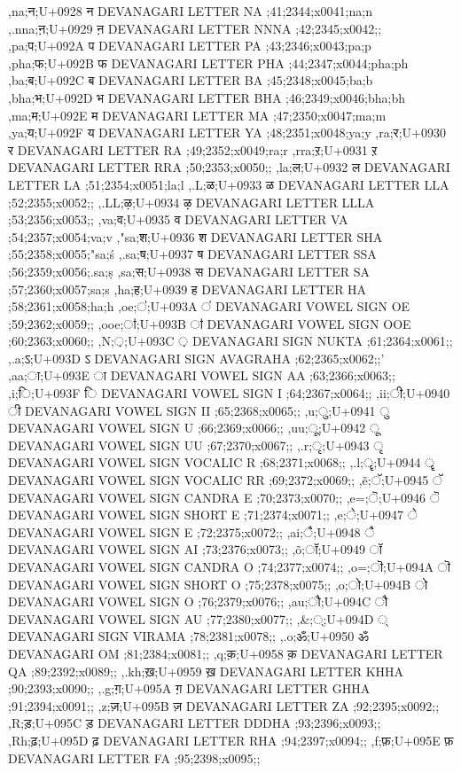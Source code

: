\documentclass{article}
\begin{document}
{,na;न;U+0928 न DEVANAGARI LETTER NA ;41;2344;x0041;na;n
,.nna;ऩ;U+0929 ऩ DEVANAGARI LETTER NNNA ;42;2345;x0042;;
,pa;प;U+092A प DEVANAGARI LETTER PA ;43;2346;x0043;pa;p
,pha;फ;U+092B फ DEVANAGARI LETTER PHA ;44;2347;x0044;pha;ph
,ba;ब;U+092C ब DEVANAGARI LETTER BA ;45;2348;x0045;ba;b
,bha;भ;U+092D भ DEVANAGARI LETTER BHA ;46;2349;x0046;bha;bh
,ma;म;U+092E म DEVANAGARI LETTER MA ;47;2350;x0047;ma;m
,ya;य;U+092F य DEVANAGARI LETTER YA ;48;2351;x0048;ya;y
,ra;र;U+0930 र DEVANAGARI LETTER RA ;49;2352;x0049;ra;r
,rra;ऱ;U+0931 ऱ DEVANAGARI LETTER RRA ;50;2353;x0050;;
,la;ल;U+0932 ल DEVANAGARI LETTER LA ;51;2354;x0051;la;l
,.L;ळ;U+0933 ळ DEVANAGARI LETTER LLA ;52;2355;x0052;;
,.LL;ऴ;U+0934 ऴ DEVANAGARI LETTER LLLA ;53;2356;x0053;;
,va;व;U+0935 व DEVANAGARI LETTER VA ;54;2357;x0054;va;v
,"sa;श;U+0936 श DEVANAGARI LETTER SHA ;55;2358;x0055;"sa;ś
,.sa;ष;U+0937 ष DEVANAGARI LETTER SSA ;56;2359;x0056;.sa;ṣ
,sa;स;U+0938 स DEVANAGARI LETTER SA ;57;2360;x0057;sa;s
,ha;ह;U+0939 ह DEVANAGARI LETTER HA ;58;2361;x0058;ha;h
,oe;ऺ;U+093A ऺ DEVANAGARI VOWEL SIGN OE ;59;2362;x0059;;
,ooe;ऻ;U+093B ऻ DEVANAGARI VOWEL SIGN OOE ;60;2363;x0060;;
,N;़;U+093C ़ DEVANAGARI SIGN NUKTA ;61;2364;x0061;;
,.a;ऽ;U+093D ऽ DEVANAGARI SIGN AVAGRAHA ;62;2365;x0062;;' 
,aa;ा;U+093E ा DEVANAGARI VOWEL SIGN AA ;63;2366;x0063;;
,i;ि;U+093F ि DEVANAGARI VOWEL SIGN I ;64;2367;x0064;;
,ii;ी;U+0940 ी DEVANAGARI VOWEL SIGN II ;65;2368;x0065;;
,u;ु;U+0941 ु DEVANAGARI VOWEL SIGN U ;66;2369;x0066;;
,uu;ू;U+0942 ू DEVANAGARI VOWEL SIGN UU ;67;2370;x0067;;
,.r;ृ;U+0943 ृ DEVANAGARI VOWEL SIGN VOCALIC R ;68;2371;x0068;;
,.l;ॄ;U+0944 ॄ DEVANAGARI VOWEL SIGN VOCALIC RR ;69;2372;x0069;;
,\~e;ॅ;U+0945 ॅ DEVANAGARI VOWEL SIGN CANDRA E ;70;2373;x0070;;
,e=;ॆ;U+0946 ॆ DEVANAGARI VOWEL SIGN SHORT E ;71;2374;x0071;;
,e;े;U+0947 े DEVANAGARI VOWEL SIGN E ;72;2375;x0072;;
,ai;ै;U+0948 ै DEVANAGARI VOWEL SIGN AI ;73;2376;x0073;;
,\~o;ॉ;U+0949 ॉ DEVANAGARI VOWEL SIGN CANDRA O ;74;2377;x0074;;
,o=;ॊ;U+094A ॊ DEVANAGARI VOWEL SIGN SHORT O ;75;2378;x0075;;
,o;ो;U+094B ो DEVANAGARI VOWEL SIGN O ;76;2379;x0076;;
,au;ौ;U+094C ौ DEVANAGARI VOWEL SIGN AU ;77;2380;x0077;;
,\&;्;U+094D ् DEVANAGARI SIGN VIRAMA ;78;2381;x0078;;
%  
%  
,.o;ॐ;U+0950 ॐ DEVANAGARI OM ;81;2384;x0081;;
%  
%  
%  
%  
%  
%  
%  
,q;क़;U+0958 क़ DEVANAGARI LETTER QA ;89;2392;x0089;;
,.kh;ख़;U+0959 ख़ DEVANAGARI LETTER KHHA ;90;2393;x0090;;
,.g;ग़;U+095A ग़ DEVANAGARI LETTER GHHA ;91;2394;x0091;;
,z;ज़;U+095B ज़ DEVANAGARI LETTER ZA ;92;2395;x0092;;
,R;ड़;U+095C ड़ DEVANAGARI LETTER DDDHA ;93;2396;x0093;;
,Rh;ढ़;U+095D ढ़ DEVANAGARI LETTER RHA ;94;2397;x0094;;
,f;फ़;U+095E फ़ DEVANAGARI LETTER FA ;95;2398;x0095;;
}
\end{document}
